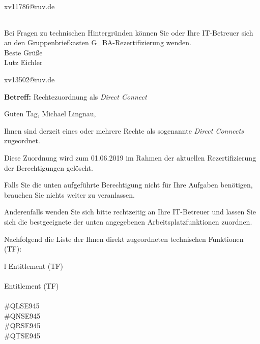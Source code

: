 \documentclass[a4paper,landscape,12pt]{letter}
\begin{document}
\begin{letter}{xv11786@ruv.de\hfill \break}
\begin{tiny}
\begin{longtable}{|p{35mm}|p{15mm}|p{25mm}|p{10mm}|p{40mm}|p{50mm}|p{50mm}|}
\hline
		\end{longtable}
		\end{tiny}
	
\begin{minipage}{\textwidth}
			Bei Fragen zu technischen Hintergründen können Sie 
			oder Ihre IT-Betreuer sich an den Gruppenbriefkasten 
			G\_BA-Rezertifizierung
			wenden.\\
			\linebreak
			Beste Grüße\\
			Lutz Eichler
	\end{minipage}
	\end{letter}
	
\begin{letter}{xv13502@ruv.de\hfill \break}
\begin{normalsize}
	\opening{\textbf{Betreff:} Rechtezuordnung als \emph{Direct Connect}}
	\begin{normalsize} \hfill
	\end{normalsize}

	\begin{normalsize}
		Guten Tag, 
	Michael Lingnau, \hfill \break
	\end{normalsize}
	\end{normalsize}
	
\begin{normalsize}
	Ihnen sind derzeit eines oder mehrere Rechte als sogenannte \emph{Direct Connects} zugeordnet.
	
	Diese Zuordnung wird zum 01.06.2019 im Rahmen der aktuellen Rezertifizierung der Berechtigungen gelöscht.
	
	Falls Sie die unten aufgeführte Berechtigung nicht für Ihre Aufgaben benötigen, 
	brauchen Sie nichts weiter zu veranlassen.
	
	Anderenfalls wenden Sie sich bitte rechtzeitig an Ihre IT-Betreuer 
	und lassen Sie sich die bestgeeignete der unten angegebenen Arbeitsplatzfunktionen zuordnen.
	\end{normalsize}
	
\begin{normalsize}
	Nachfolgend die Liste der Ihnen direkt zugeordneten technischen Funktionen (TF):

	\begin{longtable}{l}
		Entitlement (TF) \\ \hline
		\endfirsthead
		\\\hline
		Entitlement (TF) \\ \hline
		\endhead %
		\multicolumn{1}{r@{}}{Fortsetzung \ldots}\\
		\endfoot
		\hline
		\endlastfoot
	\#QLSE945\\\#QNSE945\\\#QRSE945\\\#QTSE945\\
	\end{longtable}
	\end{normalsize}
	

\end{letter}
\end{document}
